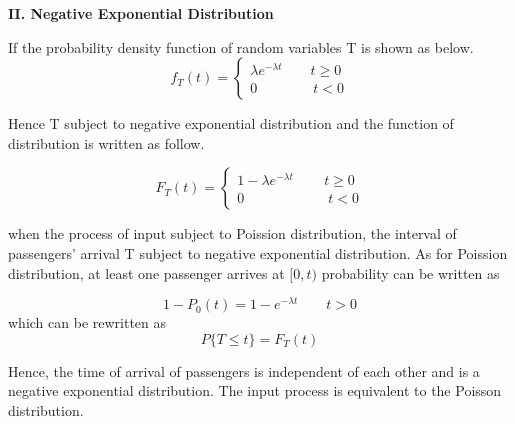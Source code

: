 \documentclass{mcmthesis}
\begin{document}
\par{\bf II. Negative Exponential Distribution}%
\par If the probability density function of random variables T is shown as below.
\begin{equation}    
f_T(t)=\left  \{
       \begin{array}{lr}
           \lambda e^{-\lambda t}\qquad t\geqslant 0\\
            0\qquad\qquad t<0
        \end{array}
\right.
\end{equation}


Hence T subject to negative exponential distribution and the function of distribution is written as follow.

\begin{equation}    
F_T(t)=\left  \{
       \begin{array}{lr}
          1- \lambda e^{-\lambda t}\qquad\,  t\geqslant 0\\
            0\qquad\qquad\qquad t<0
        \end{array}
\right.
\end{equation}

when the  process of input subject to Poission distribution, the interval of passengers' arrival T subject to  negative exponential distribution. As for Poission  distribution, at least one passenger arrives at $[0,t)$  probability can  be written as


\begin{equation}
1-P_0(t)=1-e^{-\lambda t}\qquad t>0
\end{equation}
which can be rewritten as
\begin{equation}
 P\{T\leqslant t \}=F_T(t)
\end{equation}


Hence, the time of arrival of passengers is independent of each other and is a negative exponential distribution. The input process is equivalent to the Poisson distribution.
\end{document}
